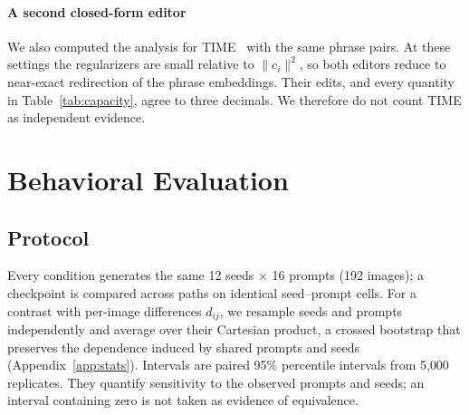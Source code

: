 \documentclass[conference]{IEEEtran}
\begin{document}
\paragraph{A second closed-form editor}
We also computed the analysis for TIME~\cite{time} with the same phrase pairs. At these
settings the regularizers are small relative to $\|c_i\|^2$, so both editors reduce to
near-exact redirection of the phrase embeddings. Their edits, and every quantity in
Table~\ref{tab:capacity}, agree to three decimals. We therefore do not count TIME as
independent evidence.
\section{Behavioral Evaluation}
\label{sec:behavior}
\subsection{Protocol}
Every condition generates the same 12 seeds $\times$ 16 prompts (192 images); a
checkpoint is compared across paths on identical seed--prompt cells. For a contrast
with per-image differences $d_{ij}$, we resample seeds and prompts independently and
average over their Cartesian product, a crossed bootstrap that preserves the
dependence induced by shared prompts and seeds~\cite{owen} (Appendix~\ref{app:stats}).
Intervals are paired 95\% percentile intervals from 5{,}000 replicates. They quantify
sensitivity to the observed prompts and seeds; an interval containing zero is not
taken as evidence of equivalence.
\end{document}
